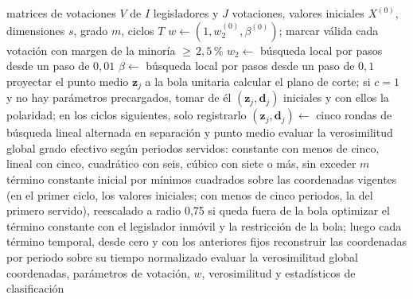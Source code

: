 \begin{algorithm}[htbp]
\caption{Ciclo de estimación del motor fiel.}
\label{alg:ciclo}
\small
\begin{algorithmic}[1]
\Require matrices de votaciones $V$ de $I$ legisladores y $J$ votaciones, valores iniciales $X^{(0)}$, dimensiones $s$, grado $m$, ciclos $T$
\State $w \gets (1, w_2^{(0)}, \beta^{(0)})$; marcar válida cada votación con margen de la minoría ${\ge}\,2{,}5$\,\%
   $w_2 \gets$ búsqueda local por pasos desde un paso de $0{,}01$ \EndIf
  \State $\beta \gets$ búsqueda local por pasos desde un paso de $0{,}1$
     \State proyectar el punto medio $\mathbf{z}_j$ a la bola unitaria
     \State calcular el plano de corte; si $c = 1$ y no hay parámetros precargados, tomar de él $(\mathbf{z}_j, \mathbf{d}_j)$ iniciales y con ellos la polaridad; en los ciclos siguientes, solo registrarlo
     \State $(\mathbf{z}_j, \mathbf{d}_j) \gets$ cinco rondas de búsqueda lineal alternada en separación y punto medio
  \EndFor
  \State evaluar la verosimilitud global
     \State grado efectivo según periodos servidos: constante con menos de cinco, lineal con cinco, cuadrático con seis, cúbico con siete o más, sin exceder $m$
     \State término constante inicial por mínimos cuadrados sobre las coordenadas vigentes (en el primer ciclo, los valores iniciales; con menos de cinco periodos, la del primero servido), reescalado a radio 0,75 si queda fuera de la bola
     \State optimizar el término constante con el legislador inmóvil y la restricción de la bola; luego cada término temporal, desde cero y con los anteriores fijos
     \State reconstruir las coordenadas por periodo sobre su tiempo normalizado
  \EndFor
  \State evaluar la verosimilitud global
\EndFor
\State \Return coordenadas, parámetros de votación, $w$, verosimilitud y estadísticos de clasificación
\end{algorithmic}
\end{algorithm}

